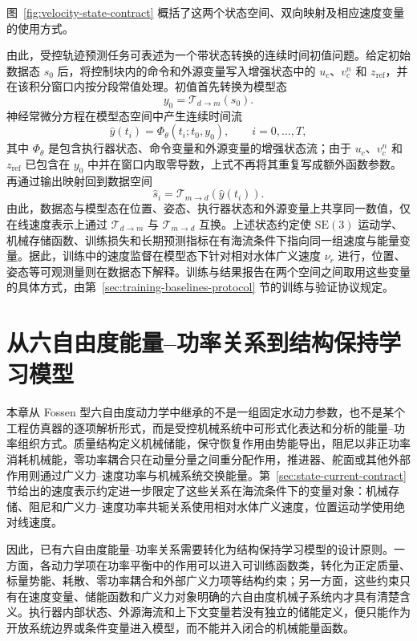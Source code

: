 \documentclass[UTF8,zihao=-4]{ctexrep}
\newcommand{\SE}{\mathrm{SE}}
\begin{document}
图~\ref{fig:velocity-state-contract} 概括了这两个状态空间、双向映射及相应速度变量的使用方式。

由此，受控轨迹预测任务可表述为一个带状态转换的连续时间初值问题。给定初始数据态 \(s_0\) 后，将控制块内的命令和外源变量写入增强状态中的 \(u_c\)、\(v_c^n\) 和 \(z_{\mathrm{ref}}\)，并在该积分窗口内按分段常值处理。初值首先转换为模型态
\begin{equation}
  y_0=\mathcal{T}_{d\to m}(s_0).
\end{equation}
神经常微分方程在模型态空间中产生连续时间流
\begin{equation}
  \hat y(t_i)
  =
  \Phi_\theta(t_i;t_0,y_0),
  \qquad i=0,\ldots,T,
\end{equation}
其中 \(\Phi_\theta\) 是包含执行器状态、命令变量和外源变量的增强状态流；由于 \(u_c\)、\(v_c^n\) 和 \(z_{\mathrm{ref}}\) 已包含在 \(y_0\) 中并在窗口内取零导数，上式不再将其重复写成额外函数参数。
再通过输出映射回到数据空间
\begin{equation}
  \hat s_i
  =
  \mathcal{T}_{m\to d}(\hat y(t_i)).
\end{equation}
由此，数据态与模型态在位置、姿态、执行器状态和外源变量上共享同一数值，仅在线速度表示上通过 \(\mathcal{T}_{d\to m}\) 与 \(\mathcal{T}_{m\to d}\) 互换。上述状态约定使 \(\SE(3)\) 运动学、机械存储函数、训练损失和长期预测指标在有海流条件下指向同一组速度与能量变量。据此，训练中的速度监督在模型态下针对相对水体广义速度 \(\nu_r\) 进行，位置、姿态等可观测量则在数据态下解释。训练与结果报告在两个空间之间取用这些变量的具体方式，由第~\ref{sec:training-baselines-protocol} 节的训练与验证协议规定。

\section{从六自由度能量--功率关系到结构保持学习模型}
\label{sec:fossen-to-structure}

本章从 Fossen 型六自由度动力学中继承的不是一组固定水动力参数，也不是某个工程仿真器的逐项解析形式，而是受控机械系统中可形式化表达和分析的能量--功率组织方式。质量结构定义机械储能，保守恢复作用由势能导出，阻尼以非正功率消耗机械能，零功率耦合只在动量分量之间重分配作用，推进器、舵面或其他外部作用则通过广义力--速度功率与机械系统交换能量。第~\ref{sec:state-current-contract} 节给出的速度表示约定进一步限定了这些关系在海流条件下的变量对象：机械存储、阻尼和广义力--速度功率共轭关系使用相对水体广义速度，位置运动学使用绝对线速度。

因此，已有六自由度能量--功率关系需要转化为结构保持学习模型的设计原则。一方面，各动力学项在功率平衡中的作用可以进入可训练函数类，转化为正定质量、标量势能、耗散、零功率耦合和外部广义力项等结构约束；另一方面，这些约束只有在速度变量、储能函数和广义力对象明确的六自由度机械子系统内才具有清楚含义。执行器内部状态、外源海流和上下文变量若没有独立的储能定义，便只能作为开放系统边界或条件变量进入模型，而不能并入闭合的机械能量函数。
\end{document}
